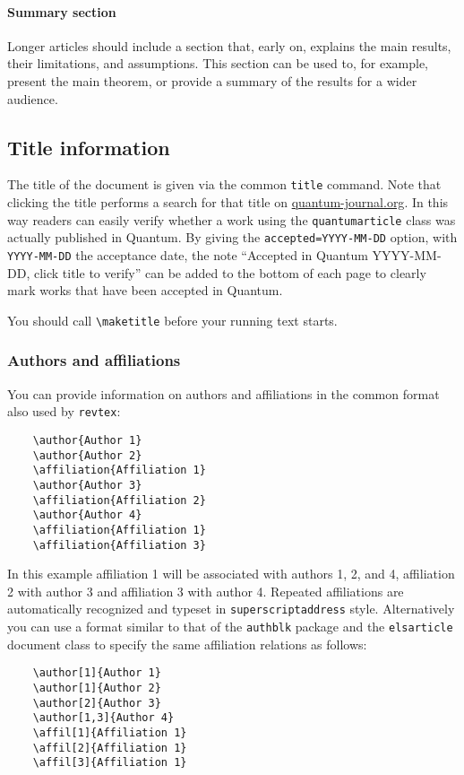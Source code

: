 \documentclass[a4paper,noarxiv,onecolumn]{quantumarticle}
\begin{document}
	\paragraph{Summary section}
	Longer articles should include a section that, early on, explains the main results, their limitations, and assumptions.
	This section can be used to, for example, present the main theorem, or provide a summary of the results for a wider audience.
	
	\subsection{Title information}
	The title of the document is given via the common \texttt{title} command. Note that clicking the title performs a search for that title on \href{http://quantum-journal.org}{quantum-journal.org}.
	In this way readers can easily verify whether a work using the \texttt{quantumarticle} class was actually published in Quantum. By giving the \texttt{accepted=YYYY-MM-DD} option, with \texttt{YYYY-MM-DD} the acceptance date, the note ``Accepted in Quantum YYYY-MM-DD, click title to verify'' can be added to the bottom of each page to clearly mark works that have been accepted in Quantum. 	
	
	You should call \texttt{\textbackslash{}maketitle} before your running text starts.
	
	\subsubsection{Authors and affiliations}
	You can provide information on authors and affiliations in the common format also used by \texttt{revtex}:
	\begin{verbatim}
	\author{Author 1}
	\author{Author 2}
	\affiliation{Affiliation 1}
	\author{Author 3}
	\affiliation{Affiliation 2}
	\author{Author 4}
	\affiliation{Affiliation 1}
	\affiliation{Affiliation 3}
	\end{verbatim}
	In this example affiliation 1 will be associated with authors 1, 2, and 4, affiliation 2 with author 3 and affiliation 3 with author 4.
	Repeated affiliations are automatically recognized and typeset in \texttt{superscriptaddress} style.
	Alternatively you can use a format similar to that of the \texttt{authblk} package and the \texttt{elsarticle} document class to specify the same affiliation relations as follows:
	\begin{verbatim}
	\author[1]{Author 1}
	\author[1]{Author 2}
	\author[2]{Author 3}
	\author[1,3]{Author 4}
	\affil[1]{Affiliation 1}
	\affil[2]{Affiliation 1}
	\affil[3]{Affiliation 1}
	\end{verbatim}
	
\end{document}
